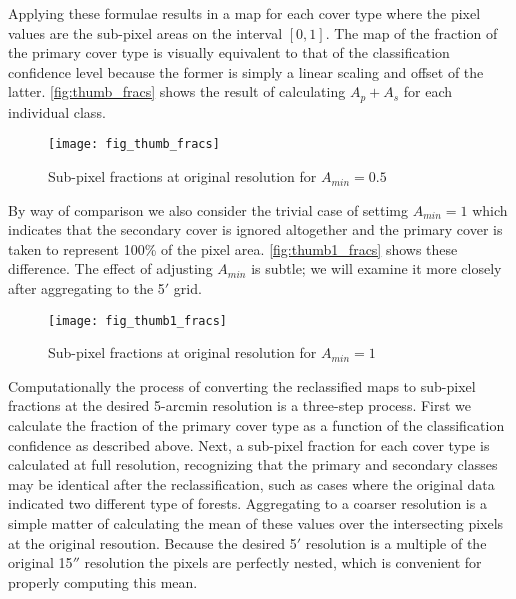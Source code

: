 Applying these formulae results in a map for each cover type where the
pixel values are the sub-pixel areas on the interval $[0,1]$.  The map
of the fraction of the primary cover type is visually equivalent to
that of the classification confidence level because the former is
simply a linear scaling and offset of the latter.  \autoref{fig:thumb_fracs} shows the result of calculating $A_p + A_s$ for each individual class.  



\begin{figure}[hpt] 
\begin{center}
  

\texttt{[image: fig\_thumb\_fracs]}
\end{center} 
\caption{Sub-pixel fractions at original resolution for $A_{min}=0.5$}
\label{fig:thumb_fracs}
\end{figure} 

By way of comparison we also consider the trivial case of settimg
$A_{min} = 1$ which indicates that the secondary cover is ignored
altogether and the primary cover is taken to represent 100\% of the
pixel area.  \autoref{fig:thumb1_fracs} shows these difference.  The
effect of adjusting $A_{min}$ is subtle; we will examine it more
closely after aggregating to the 5$'$ grid.

\begin{figure}[hpt] 
\begin{center}


\texttt{[image: fig\_thumb1\_fracs]}
\end{center} 
\caption{Sub-pixel fractions at original resolution for $A_{min}=1$}
\label{fig:thumb1_fracs}
\end{figure} 

Computationally the process of converting the reclassified maps to
sub-pixel fractions at the desired 5-arcmin resolution is a three-step
process.  First we calculate the fraction of the primary cover type as
a function of the classification confidence as described above.  Next,
a sub-pixel fraction for each cover type is calculated at full
resolution, recognizing that the primary and secondary classes may be
identical after the reclassification, such as cases where the original
data indicated two different type of forests.  Aggregating to a
coarser resolution is a simple matter of calculating the mean of these
values over the intersecting pixels at the original resoution.
Because the desired 5$'$ resolution is a multiple of the original
15$''$ resolution the pixels are perfectly nested, which is
convenient for properly computing this mean.



